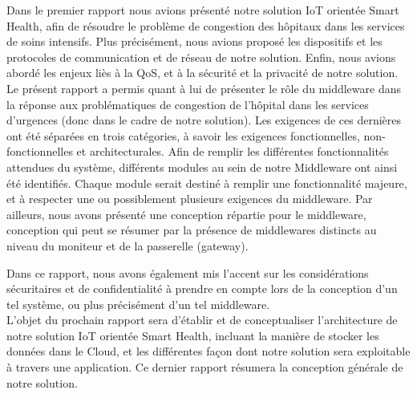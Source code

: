 Dans le premier rapport nous avions présenté notre solution IoT orientée Smart Health, afin de résoudre le problème de congestion des hôpitaux dans les services de soins intensifs. Plus précisément, nous avions proposé les dispositifs et les protocoles de communication et de réseau de notre solution. Enfin, nous avions abordé les enjeux liès à la QoS, et à la sécurité et la privacité de notre solution.
\\

Le présent rapport a permis quant à lui de présenter le rôle du middleware dans la réponse aux problématiques de congestion de l'hôpital dans les services d'urgences (donc dans le cadre de notre solution). Les exigences de ces dernières ont été séparées en trois catégories, à savoir les exigences fonctionnelles, non-fonctionnelles et architecturales. Afin de remplir les différentes fonctionnalités attendues du système, différents modules au sein de notre Middleware ont ainsi été identifiés. Chaque module serait destiné à remplir une fonctionnalité majeure, et à respecter une ou possiblement plusieurs exigences du middleware. Par ailleurs, nous avons présenté une conception répartie pour le middleware, conception qui peut se résumer par la présence de middlewares distincts au niveau du moniteur et de la passerelle (gateway).

Dans ce rapport, nous avons également mis l'accent sur les considérations sécuritaires et de confidentialité à prendre en compte lors de la conception d'un tel système, ou plus précisément d'un tel middleware.
\\

L'objet du prochain rapport sera d'établir et de conceptualiser l'architecture de notre solution IoT orientée Smart Health, incluant la manière de stocker les données dans le Cloud, et les différentes façon dont notre solution sera exploitable à travers une application. Ce dernier rapport résumera la conception générale de notre solution.
